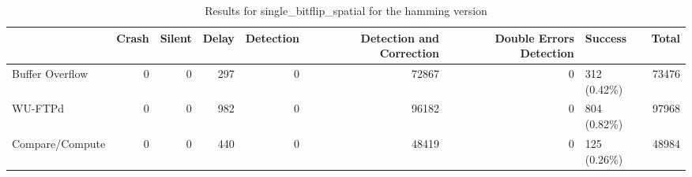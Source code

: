 \begin{table}[t]
	\centering
	\caption{Results for single_bitflip_spatial for the hamming version}
	\label{table:end_sim_by_status_hamming_2_single_bitflip_spatial}
	\begin{tabular}{lrrrrrrlr}
		\toprule
		                & Crash & Silent & Delay & Detection & Detection and Correction & Double Errors Detection & Success      & Total \\
		\midrule
		Buffer Overflow & 0     & 0      & 297   & 0         & 72867                    & 0                       & 312 (0.42\%) & 73476 \\
		WU-FTPd         & 0     & 0      & 982   & 0         & 96182                    & 0                       & 804 (0.82\%) & 97968 \\
		Compare/Compute & 0     & 0      & 440   & 0         & 48419                    & 0                       & 125 (0.26\%) & 48984 \\
		\bottomrule
	\end{tabular}
\end{table}
